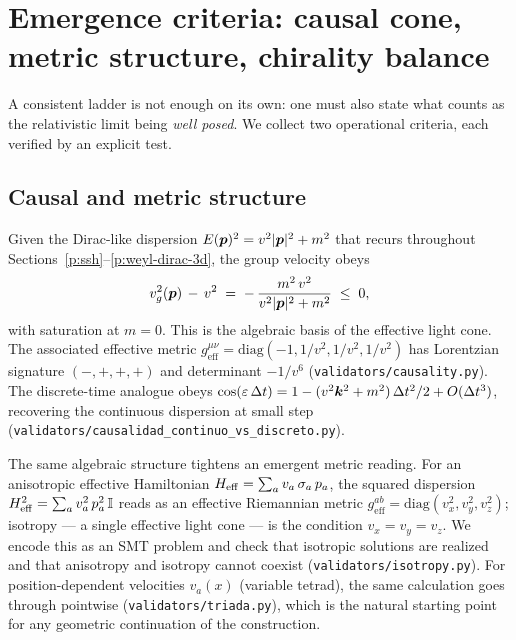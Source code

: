 \section{Emergence criteria: causal cone, metric structure, chirality balance}
\label{p:criteria}

A consistent ladder is not enough on its own: one must also state what
counts as the relativistic limit being \emph{well posed}. We collect two
operational criteria, each verified by an explicit test.

\subsection{Causal and metric structure}
Given the Dirac-like dispersion $E(\bm{p})^{2} = v^{2}\lvert\bm{p}\rvert^{2}+m^{2}$
that recurs throughout Sections~\ref{p:ssh}--\ref{p:weyl-dirac-3d}, the
group velocity obeys
\begin{equation}
v_{g}^{2}(\bm{p}) \,-\, v^{2}
   \;=\; -\,\frac{m^{2}\,v^{2}}{v^{2}\lvert\bm{p}\rvert^{2}+m^{2}} \;\le\; 0 ,
\label{p:eq:vg-bound}
\end{equation}
with saturation at $m=0$. This is the algebraic basis of the effective
light cone. The associated effective metric
$g^{\mu\nu}_{\mathrm{eff}} = \mathrm{diag}(-1,1/v^{2},1/v^{2},1/v^{2})$
has Lorentzian signature $(-,+,+,+)$ and determinant $-1/v^{6}$
(\texttt{validators/causality.py}). The discrete-time analogue obeys
$\cos(\varepsilon\,\Delta t) = 1-(v^{2}\bm{k}^{2}+m^{2})\,\Delta t^{2}/2 + O(\Delta t^{3})$,
recovering the continuous dispersion at small step
(\texttt{validators/causalidad\_continuo\_vs\_discreto.py}).

The same algebraic structure tightens an emergent metric reading. For
an anisotropic effective Hamiltonian
$H_{\mathrm{eff}} = \sum_{a} v_{a}\,\sigma_{a}\,p_{a}$, the squared
dispersion
$H_{\mathrm{eff}}^{2}=\sum_{a}v_{a}^{2}\,p_{a}^{2}\,\mathbb{I}$ reads as an
effective Riemannian metric
$g^{ab}_{\mathrm{eff}} = \mathrm{diag}(v_{x}^{2},v_{y}^{2},v_{z}^{2})$;
isotropy --- a single effective light cone --- is the condition
$v_{x}=v_{y}=v_{z}$. We encode this as an SMT problem and check that
isotropic solutions are realized and that anisotropy and isotropy
cannot coexist (\texttt{validators/isotropy.py}). For
position-dependent velocities $v_{a}(x)$ (variable tetrad), the same
calculation goes through pointwise
(\texttt{validators/triada.py}), which is the natural starting point
for any geometric continuation of the construction.

